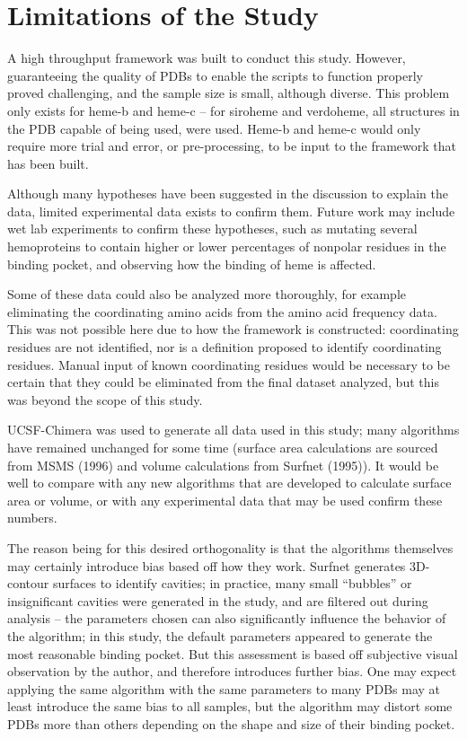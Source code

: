 \documentclass[a4paper, nobind]{templates/ociamthesis}
\begin{document}
\hypertarget{limitations-of-the-study}{%
\section{Limitations of the Study}\label{limitations-of-the-study}}

A high throughput framework was built to conduct this study. However, guaranteeing the quality of PDBs to enable the scripts to function properly proved challenging, and the sample size is small, although diverse. This problem only exists for heme-b and heme-c -- for siroheme and verdoheme, all structures in the PDB capable of being used, were used. Heme-b and heme-c would only require more trial and error, or pre-processing, to be input to the framework that has been built.

Although many hypotheses have been suggested in the discussion to explain the data, limited experimental data exists to confirm them. Future work may include wet lab experiments to confirm these hypotheses, such as mutating several hemoproteins to contain higher or lower percentages of nonpolar residues in the binding pocket, and observing how the binding of heme is affected.

Some of these data could also be analyzed more thoroughly, for example eliminating the coordinating amino acids from the amino acid frequency data. This was not possible here due to how the framework is constructed: coordinating residues are not identified, nor is a definition proposed to identify coordinating residues. Manual input of known coordinating residues would be necessary to be certain that they could be eliminated from the final dataset analyzed, but this was beyond the scope of this study.

UCSF-Chimera was used to generate all data used in this study; many algorithms have remained unchanged for some time (surface area calculations are sourced from MSMS (1996) and volume calculations from Surfnet (1995)). It would be well to compare with any new algorithms that are developed to calculate surface area or volume, or with any experimental data that may be used confirm these numbers.

The reason being for this desired orthogonality is that the algorithms themselves may certainly introduce bias based off how they work. Surfnet generates 3D-contour surfaces to identify cavities; in practice, many small ``bubbles'' or insignificant cavities were generated in the study, and are filtered out during analysis -- the parameters chosen can also significantly influence the behavior of the algorithm; in this study, the default parameters appeared to generate the most reasonable binding pocket. But this assessment is based off subjective visual observation by the author, and therefore introduces further bias. One may expect applying the same algorithm with the same parameters to many PDBs may at least introduce the same bias to all samples, but the algorithm may distort some PDBs more than others depending on the shape and size of their binding pocket.
\end{document}

